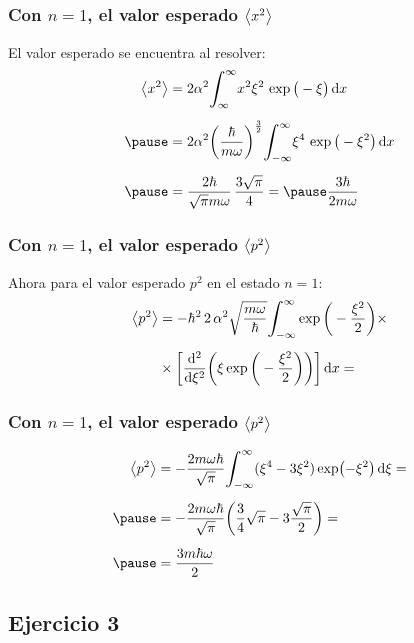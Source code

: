 \documentclass[12pt]{beamer}
\begin{document}
\begin{frame}
\frametitle{Con $n = 1$, el valor esperado $\expval{x^{2}}$}
El valor esperado se encuentra al resolver:
\begin{eqnarray*}
\begin{aligned}
\expval{x^{2}} &= 2 \alpha^{2} \scaleint{6ex}_{\bs \-\infty}^{\infty} x^{2} \xi^{2} \, \exp\big( - \xi \big) \dd{x} \\[0.5em] \pause
&= 2 \alpha^{2} \bigg( \dfrac{\hbar}{m \omega} \bigg)^{\frac{3}{2}} \scaleint{6ex}_{\bs -\infty}^{\infty} \xi^{4} \, \exp\big( - \xi^{2} \big) \dd{x} \\[0.5em] \pause
&= \dfrac{2 \hbar}{\sqrt{\pi} m \omega} \, \dfrac{3 \sqrt{\pi}}{4} = \pause \dfrac{3 \hbar}{2 m \omega}
\end{aligned}
\end{eqnarray*}
\end{frame}
\begin{frame}
\frametitle{Con $n = 1$, el valor esperado $\expval{p^{2}}$}
Ahora para el valor esperado $p^{2}$ en el estado $n = 1$:
\pause
\begin{eqnarray*}
\begin{aligned}
\expval{p^{2}} &= - \hbar^{2} \, 2 \, \alpha^{2} \sqrt{\dfrac{m \omega}{\hbar}} \scaleint{6ex}_{\bs - \infty}^{\infty} \exp \bigg( - \dfrac{\xi^{2}}{2} \bigg) \times \\[0.5em]
&\times \bigg[ \dv[2]{\xi} (\xi \exp\bigg( - \dfrac{\xi^{2}}{2} \bigg)) \bigg]  \dd{x} =
\end{aligned}
\end{eqnarray*}
\end{frame}
\begin{frame}
\frametitle{Con $n = 1$, el valor esperado $\expval{p^{2}}$}
\begin{eqnarray*}
\begin{aligned}
\expval{p^{2}} &= - \dfrac{2 m \omega \hbar}{\sqrt{\pi}} \scaleint{6ex}_{\bs - \infty}^{\infty} (\xi^{4} - 3 \xi^{2}) \exp (-\xi^{2}) \dd{\xi} = \\[0.5em] \pause
&= - \dfrac{2 m \omega \hbar}{\sqrt{\pi}} \bigg( \dfrac{3}{4} \sqrt{\pi} - 3 \dfrac{\sqrt{\pi}}{2} \bigg) = \\[0.5em] \pause
&= \dfrac{3 m \hbar \omega}{2}
\end{aligned}
\end{eqnarray*}
\end{frame}

\subsection{Ejercicio 3}
\end{document}
